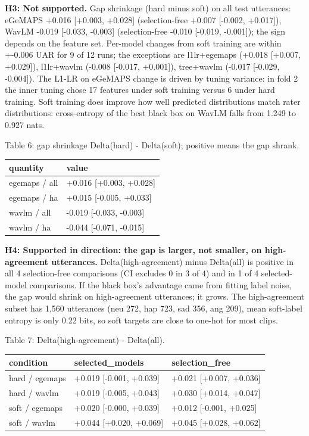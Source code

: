 \documentclass[11pt]{article}
\begin{document}
\textbf{H3: Not supported.} Gap shrinkage (hard minus soft) on all test utterances: eGeMAPS +0.016 {[}+0.003, +0.028{]} (selection-free +0.007 {[}-0.002, +0.017{]}), WavLM -0.019 {[}-0.033, -0.003{]} (selection-free -0.010 {[}-0.019, -0.001{]}); the sign depends on the feature set. Per-model changes from soft training are within +-0.006 UAR for 9 of 12 runs; the exceptions are l1lr+egemaps (+0.018 {[}+0.007, +0.029{]}), l1lr+wavlm (-0.008 {[}-0.017, +0.001{]}), tree+wavlm (-0.017 {[}-0.029, -0.004{]}). The L1-LR on eGeMAPS change is driven by tuning variance: in fold 2 the inner tuning chose 17 features under soft training versus 6 under hard training. Soft training does improve how well predicted distributions match rater distributions: cross-entropy of the best black box on WavLM falls from 1.249 to 0.927 nats.

Table 6: gap shrinkage Delta(hard) - Delta(soft); positive means the gap shrank.

\begin{longtable}[]{@{}ll@{}}
\toprule\noalign{}
quantity & value \\
\midrule\noalign{}
\endhead
\bottomrule\noalign{}
\endlastfoot
egemaps / all & +0.016 {[}+0.003, +0.028{]} \\
egemaps / ha & +0.015 {[}-0.005, +0.033{]} \\
wavlm / all & -0.019 {[}-0.033, -0.003{]} \\
wavlm / ha & -0.044 {[}-0.071, -0.015{]} \\
\end{longtable}

\textbf{H4: Supported in direction: the gap is larger, not smaller, on high-agreement utterances.} Delta(high-agreement) minus Delta(all) is positive in all 4 selection-free comparisons (CI excludes 0 in 3 of 4) and in 1 of 4 selected-model comparisons. If the black box's advantage came from fitting label noise, the gap would shrink on high-agreement utterances; it grows. The high-agreement subset has 1,560 utterances (neu 272, hap 723, sad 356, ang 209), mean soft-label entropy is only 0.22 bits, so soft targets are close to one-hot for most clips.

Table 7: Delta(high-agreement) - Delta(all).

\begin{longtable}[]{@{}lll@{}}
\toprule\noalign{}
condition & selected\_models & selection\_free \\
\midrule\noalign{}
\endhead
\bottomrule\noalign{}
\endlastfoot
hard / egemaps & +0.019 {[}-0.001, +0.039{]} & +0.021 {[}+0.007, +0.036{]} \\
hard / wavlm & +0.019 {[}-0.005, +0.043{]} & +0.030 {[}+0.014, +0.047{]} \\
soft / egemaps & +0.020 {[}-0.000, +0.039{]} & +0.012 {[}-0.001, +0.025{]} \\
soft / wavlm & +0.044 {[}+0.020, +0.069{]} & +0.045 {[}+0.028, +0.062{]} \\
\end{longtable}
\end{document}
